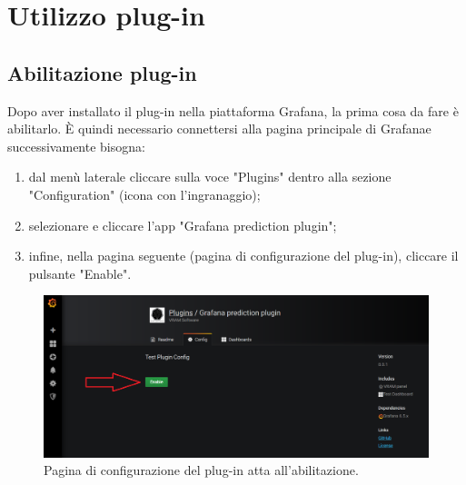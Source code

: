 \section{Utilizzo plug-in}
    \subsection{Abilitazione plug-in}
        Dopo aver installato il plug-in nella piattaforma Grafana\glo, la prima cosa da fare è abilitarlo. È quindi necessario connettersi alla pagina principale di Grafana\glosp e successivamente bisogna:
        \begin{enumerate}
            \item dal menù laterale cliccare sulla voce "Plugins" dentro alla sezione "Configuration" (icona con l'ingranaggio);
            \item selezionare e cliccare l'app "Grafana prediction plugin";
            \item infine, nella pagina seguente (pagina di configurazione del plug-in), cliccare il pulsante "Enable".
        \end{enumerate}
        \begin{figure}[H]
            \includegraphics[width=\textwidth,height=\textheight,keepaspectratio]{img/abilitazione_plug-in.png}
            \caption{Pagina di configurazione del plug-in atta all'abilitazione.}
        \end{figure}
